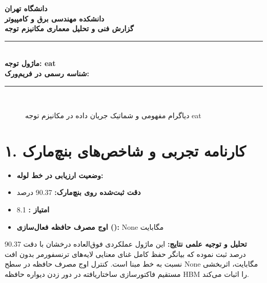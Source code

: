 \documentclass[12pt,a4paper]{article}
\begin{document}
\begin{center}
{\Large\bfseries دانشگاه تهران}\\[0.2cm]
{\large\bfseries دانشکده مهندسی برق و کامپیوتر}\\[0.2cm]
{\large\bfseries گزارش فنی و تحلیل معماری مکانیزم توجه}\\[0.5cm]
\rule{\linewidth}{1pt}\\[0.3cm]
{\LARGE\bfseries ماژول توجه: eat}\\[0.2cm]
{\large \textbf{شناسه رسمی در فریم‌ورک:} }\\[0.2cm]
\rule{\linewidth}{1pt}\\[0.5cm]
\end{center}

\begin{figure}[H]
\centering
{}
\caption{دیاگرام مفهومی و شماتیک جریان داده در مکانیزم توجه eat}
\end{figure}

\section*{۱. کارنامه تجربی و شاخص‌های بنچ‌مارک}
\begin{itemize}
\item \textbf{وضعیت ارزیابی در خط لوله:} 
\item \textbf{دقت ثبت‌شده روی بنچ‌مارک:} 90.37 درصد
\item \textbf{امتیاز :} 8.1
\item \textbf{اوج مصرف حافظه فعال‌سازی ():} None مگابایت
\end{itemize}
\textbf{تحلیل و توجیه علمی نتایج:} این ماژول عملکردی فوق‌العاده درخشان با دقت 90.37 درصد ثبت نموده که بیانگر حفظ کامل غنای معنایی لایه‌های ترنسفورمر بدون افت نسبت به خط مبنا است. کنترل اوج مصرف حافظه در سطح None مگابایت، اثربخشی مستقیم فاکتورسازی ساختاریافته در دور زدن دیواره حافظه HBM را اثبات می‌کند.
\end{document}
